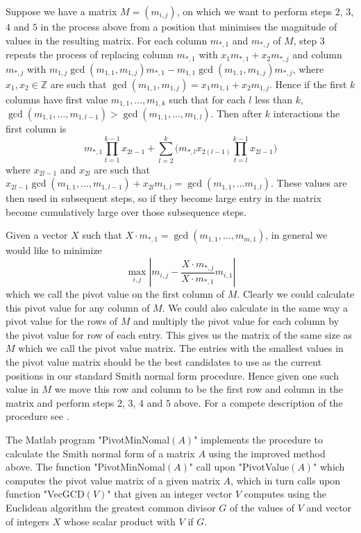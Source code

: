 \documentclass{article}
\theoremstyle{plain}
\theoremstyle{definition}
\numberwithin{thm}{section}
\begin{document}
				Suppose we have a matrix $M=(m_{i,j})$, on which we want to perform steps $2$, $3$, $4$ and $5$ in the process above from a position
				that minimises the magnitude of values in the resulting matrix.
				For each column $m_{*,1}$ and $m_{*,j}$ of $M$, step $3$ repeats the process of replacing column $m_{*,1}$ with $x_1m_{*,1}+x_2m_{*,j}$
				and column $m_{*,j}$ with $m_{1,j}\gcd(m_{1,1},m_{1,j})m_{*,1}-m_{1,1}\gcd(m_{1,1},m_{1,j})m_{*,j}$,
				where $x_1,x_2\in \mathbb{Z}$ are such that $\gcd(m_{1,1},m_{1,j})=x_1m_{1,1}+x_2m_{1,j}$.
				Hence if the first $k$ columns have first value $m_{1,1},\dots,m_{1,k}$ such that for each $l$ less than $k$,
				$\gcd(m_{1,1},\dots,m_{1,l-1})>\gcd(m_{1,1},\dots,m_{1,l})$.
				Then after $k$ interactions the first column is
				\begin{equation*}
					m_{*,1}\prod_{t=1}^{k-1}x_{2t-1}+\sum^k_{l=2}\big( m_{*,l}x_{2(l-1)}\prod^{k-1}_{t=l} x_{2l-1} \big)
				\end{equation*}
				where $x_{2l-1}$ and $x_{2l}$ are such that $x_{2l-1}\gcd(m_{1,1},\dots,m_{1,l-1})+x_{2l}m_{1,l}=\gcd(m_{1,1},\dots m_{1,l})$.
				These values are then used in subsequent steps, so if they become large entry in the matrix become cumulatively large over those subsequence steps.
				
				Given a vector $X$ such that $X\cdot m_{*,1}=\gcd(m_{1,1},\dots,m_{m,1})$,
				in general we would like to minimize
				\begin{equation*}
					\max_{i,j}|m_{i,j}-\frac{X\cdot m_{*,j}}{X \cdot m_{*,1}}m_{i,1}|
				\end{equation*}
				which we call the pivot value on the first column of $M$.
				Clearly we could calculate this pivot value for any column of $M$.
				We could also calculate in the same way a pivot value for the rows of $M$
				and multiply the pivot value for each column by the pivot value for row of each entry.
				This gives us the matrix of the same size as $M$ which we call the pivot value matrix.
				The entries with the smallest values in the pivot value matrix should be the best candidates to use as the current positions in our standard 
				Smith normal form procedure.
				Hence given one such value in $M$ we move this row and column to be the first row and column in the matrix and perform steps $2$, $3$, $4$ and $5$ above. 
				For a compete description of the procedure see \cite{SmithForm}.
				
				The Matlab program "PivotMinNomal$(A)$" implements the procedure to calculate the Smith normal form of a matrix $A$ using the improved method above.
				The function "PivotMinNomal$(A)$" call upon "PivotValue$(A)$" which computes the pivot value matrix of a given matrix $A$,
				which in turn calls upon function "VecGCD$(V)$" that given an integer vector $V$ computes using the Euclidean algorithm the greatest common divisor $G$
				of the values of $V$ and vector of integers $X$ whose scalar product with $V$ if $G$.
				
\end{document}
